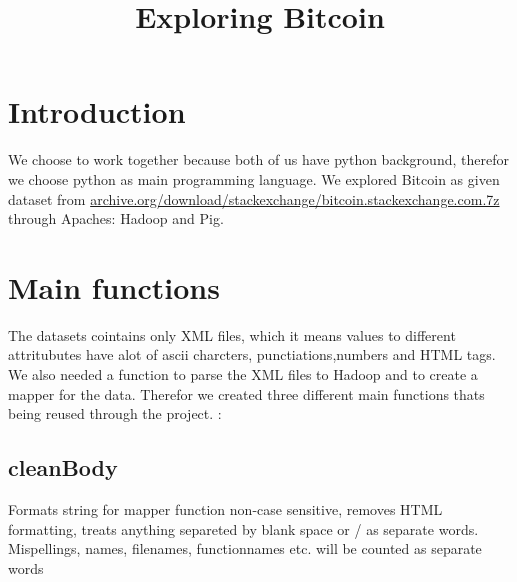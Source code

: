 \documentclass[fleqn,10pt]{wlscirep}
\title{Exploring Bitcoin }
\author{}
\begin{document}





\flushbottom
\maketitle


\section*{Introduction}
We choose to work together because both of us have python background, therefor we choose python as main programming language. We explored Bitcoin as given dataset from \url{archive.org/download/stackexchange/bitcoin.stackexchange.com.7z}  through Apaches: Hadoop and Pig. 

\section*{Main functions}
The datasets cointains only XML files, which it means values to different attritubutes have alot of  ascii charcters, punctiations,numbers and HTML tags. We also needed a function to parse the XML files to Hadoop and to create a mapper for the data.  Therefor we created three different main functions thats being reused through the project. : 
\subsection{cleanBody}
Formats string for mapper function
non-case sensitive, removes HTML formatting, treats anything separeted
by blank space or / as separate words. Mispellings, names, filenames,
functionnames etc. will be counted as separate words
\end{document}
